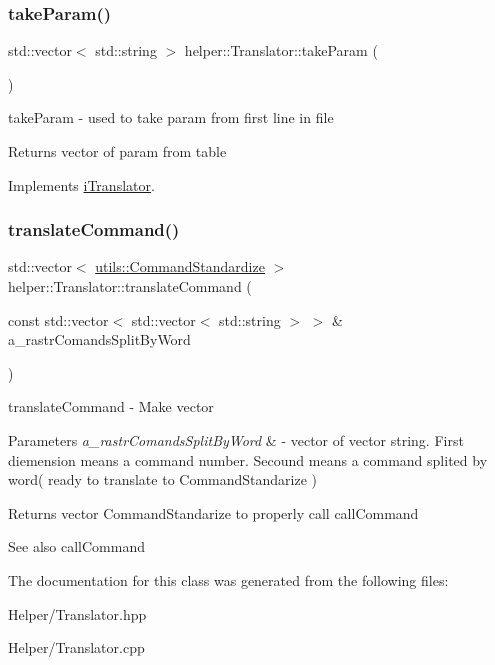 \mbox{\label{classhelper_1_1_translator_a10a9763f9cdb15732b6dc9f0bca7cc7b}} 
\subsubsection{\texorpdfstring{takeParam()}{takeParam()}}
{\footnotesize\ttfamily std\+::vector$<$ std\+::string $>$ helper\+::\+Translator\+::take\+Param (\begin{DoxyParamCaption}{ }\end{DoxyParamCaption})\hspace{0.3cm}{\ttfamily [virtual]}}



take\+Param -\/ used to take param from first line in file 

\begin{DoxyReturn}{Returns}
vector of param from table 
\end{DoxyReturn}


Implements \mbox{\hyperlink{classi_translator}{i\+Translator}}.

\mbox{\label{classhelper_1_1_translator_ad34c90b65d84e99b2cbf7188739f459d}} 
\subsubsection{\texorpdfstring{translateCommand()}{translateCommand()}}
{\footnotesize\ttfamily std\+::vector$<$ \mbox{\hyperlink{structutils_1_1_command_standardize}{utils\+::\+Command\+Standardize}} $>$ helper\+::\+Translator\+::translate\+Command (\begin{DoxyParamCaption}\item[{const std\+::vector$<$ std\+::vector$<$ std\+::string $>$ $>$ \&}]{a\+\_\+rastr\+Comands\+Split\+By\+Word }\end{DoxyParamCaption})}



translate\+Command -\/ Make vector 


\begin{DoxyParams}{Parameters}
{\em a\+\_\+rastr\+Comands\+Split\+By\+Word} & -\/ vector of vector string. First diemension means a command number. Secound means a command splited by word( ready to translate to Command\+Standarize ) \\
\hline
\end{DoxyParams}
\begin{DoxyReturn}{Returns}
vector Command\+Standarize to properly call call\+Command 
\end{DoxyReturn}
\begin{DoxySeeAlso}{See also}
call\+Command 
\end{DoxySeeAlso}


The documentation for this class was generated from the following files\+:\begin{DoxyCompactItemize}
\item 
Helper/Translator.\+hpp\item 
Helper/Translator.\+cpp\end{DoxyCompactItemize}
